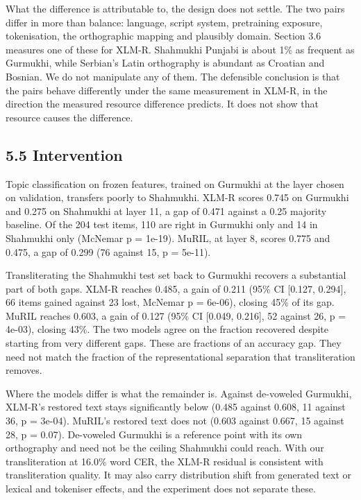 What the difference is attributable to, the design does not settle. The
two pairs differ in more than balance: language, script system,
pretraining exposure, tokenisation, the orthographic mapping and
plausibly domain. Section 3.6 measures one of these for XLM-R. Shahmukhi
Punjabi is about 1\% as frequent as Gurmukhi, while Serbian's Latin
orthography is abundant as Croatian and Bosnian. We do not manipulate
any of them. The defensible conclusion is that the pairs behave
differently under the same measurement in XLM-R, in the direction the
measured resource difference predicts. It does not show that resource
causes the difference.

\hypertarget{intervention-1}{%
\subsection{5.5 Intervention}\label{intervention-1}}

Topic classification on frozen features, trained on Gurmukhi at the
layer chosen on validation, transfers poorly to Shahmukhi. XLM-R scores
0.745 on Gurmukhi and 0.275 on Shahmukhi at layer 11, a gap of 0.471
against a 0.25 majority baseline. Of the 204 test items, 110 are right
in Gurmukhi only and 14 in Shahmukhi only (McNemar p = 1e-19). MuRIL, at
layer 8, scores 0.775 and 0.475, a gap of 0.299 (76 against 15, p =
5e-11).

Transliterating the Shahmukhi test set back to Gurmukhi recovers a
substantial part of both gaps. XLM-R reaches 0.485, a gain of 0.211
(95\% CI {[}0.127, 0.294{]}, 66 items gained against 23 lost, McNemar p
= 6e-06), closing 45\% of its gap. MuRIL reaches 0.603, a gain of 0.127
(95\% CI {[}0.049, 0.216{]}, 52 against 26, p = 4e-03), closing 43\%.
The two models agree on the fraction recovered despite starting from
very different gaps. These are fractions of an accuracy gap. They need
not match the fraction of the representational separation that
transliteration removes.

Where the models differ is what the remainder is. Against de-voweled
Gurmukhi, XLM-R's restored text stays significantly below (0.485 against
0.608, 11 against 36, p = 3e-04). MuRIL's restored text does not (0.603
against 0.667, 15 against 28, p = 0.07). De-voweled Gurmukhi is a
reference point with its own orthography and need not be the ceiling
Shahmukhi could reach. With our transliteration at 16.0\% word CER, the
XLM-R residual is consistent with transliteration quality. It may also
carry distribution shift from generated text or lexical and tokeniser
effects, and the experiment does not separate these.

